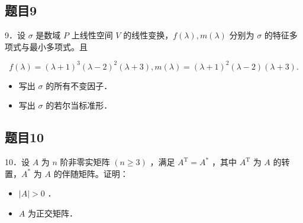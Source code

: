 \documentclass{article}
\begin{document}
\subsection{题目9}
9．设 \(\sigma\) 是数域 \(P\) 上线性空间 \(V\) 的线性变换，\(f(\lambda), m(\lambda)\) 分别为 \(\sigma\) 的特征多项式与最小多项式。且

\[
f(\lambda)=(\lambda+1)^{3}(\lambda-2)^{2}(\lambda+3), m(\lambda)=(\lambda+1)^{2}(\lambda-2)(\lambda+3) .
\]

\begin{itemize}
  \item[（1）] 写出 \(\sigma\) 的所有不变因子．
  \item[（2）] 写出 \(\sigma\) 的若尔当标准形．
\end{itemize}

\subsection{题目10}
10．设 \(A\) 为 \(n\) 阶非零实矩阵 \((n \geq 3)\) ，满足 \(A^{\mathrm{T}}=A^{*}\) ，其中 \(A^{\mathrm{T}}\) 为 \(A\) 的转置，\(A^{*}\) 为 \(A\) 的伴随矩阵。证明：

\begin{itemize}
  \item[（1）] \(|A|>0\) ．
  \item[（2）] \(A\) 为正交矩阵．
\end{itemize}
\end{document}
